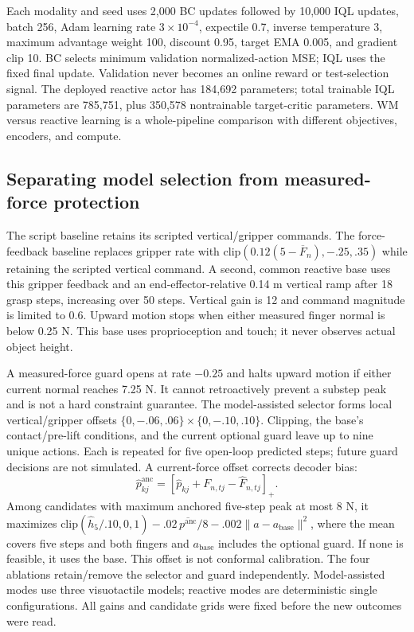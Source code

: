 \documentclass[letterpaper,10pt,conference]{ieeeconf}
\begin{document}
Each modality and seed uses 2,000 BC updates followed by 10,000 IQL updates,
batch 256, Adam learning rate $3\times10^{-4}$, expectile 0.7, inverse
temperature 3, maximum advantage weight 100, discount 0.95, target EMA
0.005, and gradient clip 10. BC selects minimum validation normalized-action
MSE; IQL uses the fixed final update. Validation never becomes an online
reward or test-selection signal. The deployed reactive actor has 184,692
parameters; total trainable IQL parameters are 785,751, plus 350,578
nontrainable target-critic parameters. WM versus reactive learning is a
whole-pipeline comparison with different objectives, encoders, and compute.

\subsection{Separating model selection from measured-force protection}
The script baseline retains its scripted vertical/gripper commands.
The force-feedback baseline replaces gripper rate with
$\mathrm{clip}(0.12(5-\overline F_n),-.25,.35)$ while retaining the
scripted vertical command. A second, common reactive base uses this
gripper feedback and an end-effector-relative 0.14 m vertical ramp after
18 grasp steps, increasing over 50 steps. Vertical gain is 12 and command
magnitude is limited to 0.6. Upward motion stops when either measured
finger normal is below 0.25 N. This base uses proprioception and touch;
it never observes actual object height.

A measured-force guard opens at rate $-0.25$ and halts upward motion if
either current normal reaches 7.25 N. It cannot retroactively prevent a
substep peak and is not a hard constraint guarantee. The model-assisted
selector forms local vertical/gripper offsets
$\{0,-.06,.06\}\times\{0,-.10,.10\}$. Clipping, the base's contact/pre-lift
conditions, and the current optional guard leave up to nine unique actions.
Each is repeated for five open-loop predicted steps; future guard decisions
are not simulated.
A current-force offset corrects decoder bias:
\begin{equation}
\widehat p^{\mathrm{anc}}_{kj}=
\left[\widehat p_{kj}+F_{n,tj}-\widehat F_{n,tj}\right]_+.
\end{equation}
Among candidates with maximum anchored five-step peak at most 8 N, it
maximizes $\mathrm{clip}(\widehat h_5/.10,0,1)
-.02\,\overline{p^{\mathrm{anc}}}/8-.002\|a-a_{\mathrm{base}}\|^2$,
where the mean covers five steps and both fingers and $a_{\mathrm{base}}$
includes the optional guard. If none is feasible, it uses the base.
This offset is not conformal
calibration. The four ablations retain/remove the selector and guard
independently. Model-assisted modes use three visuotactile models;
reactive modes are deterministic single configurations. All gains and
candidate grids were fixed before the new outcomes were read.
\end{document}
